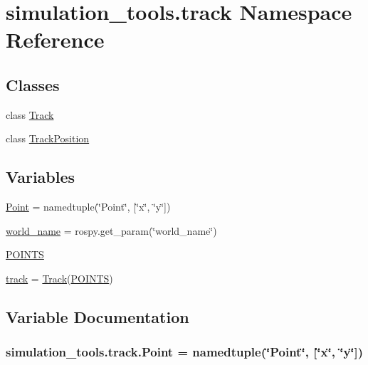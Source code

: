 \hypertarget{namespacesimulation__tools_1_1track}{}\section{simulation\+\_\+tools.\+track Namespace Reference}
\label{namespacesimulation__tools_1_1track}
\subsection*{Classes}
\begin{DoxyCompactItemize}
\item 
class \hyperlink{classsimulation__tools_1_1track_1_1_track}{Track}
\item 
class \hyperlink{classsimulation__tools_1_1track_1_1_track_position}{Track\+Position}
\end{DoxyCompactItemize}
\subsection*{Variables}
\begin{DoxyCompactItemize}
\item 
\hyperlink{namespacesimulation__tools_1_1track_a927c1793846ca41f328e4b427075cafd}{Point} = namedtuple(\char`\"{}Point\char`\"{}, \mbox{[}\char`\"{}x\char`\"{}, \char`\"{}y\char`\"{}\mbox{]})
\item 
\hyperlink{namespacesimulation__tools_1_1track_ab4fe6910a622507d50763ab0aeb7d990}{world\+\_\+name} = rospy.\+get\+\_\+param(\char`\"{}world\+\_\+name\char`\"{})
\item 
\hyperlink{namespacesimulation__tools_1_1track_ab9ddc4d3ba8bb81a3ce02320f46c8a55}{P\+O\+I\+N\+TS}
\item 
\hyperlink{namespacesimulation__tools_1_1track_ac731095c2502c445d46302406cb81651}{track} = \hyperlink{classsimulation__tools_1_1track_1_1_track}{Track}(\hyperlink{namespacesimulation__tools_1_1track_ab9ddc4d3ba8bb81a3ce02320f46c8a55}{P\+O\+I\+N\+TS})
\end{DoxyCompactItemize}


\subsection{Variable Documentation}
\subsubsection[{\texorpdfstring{Point}{Point}}]{\setlength{\rightskip}{0pt plus 5cm}simulation\+\_\+tools.\+track.\+Point = namedtuple(\char`\"{}Point\char`\"{}, \mbox{[}\char`\"{}x\char`\"{}, \char`\"{}y\char`\"{}\mbox{]})}\hypertarget{namespacesimulation__tools_1_1track_a927c1793846ca41f328e4b427075cafd}{}\label{namespacesimulation__tools_1_1track_a927c1793846ca41f328e4b427075cafd}


